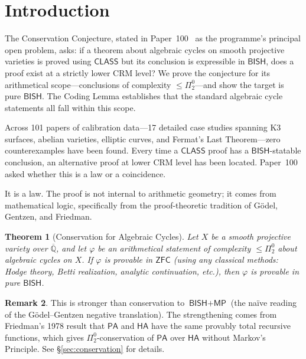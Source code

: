 \documentclass[11pt,a4paper]{article}
\theoremstyle{plain}
\newtheorem{theorem}{Theorem}[section]
\theoremstyle{definition}
\newtheorem{remark}[theorem]{Remark}
\newcommand{\BISH}{\textsf{BISH}}
\newcommand{\MP}{\textsf{MP}}
\newcommand{\CLASS}{\textsf{CLASS}}
\newcommand{\HA}{\textsf{HA}}
\newcommand{\PA}{\textsf{PA}}
\newcommand{\ZFC}{\textsf{ZFC}}
\newcommand{\Q}{\mathbb{Q}}
\begin{document}
\tableofcontents
\newpage

\section{Introduction}\label{sec:intro}

The Conservation Conjecture, stated in Paper~100~\cite{p100} as the programme's principal open problem, asks: if a theorem about algebraic cycles on smooth projective varieties is proved using $\CLASS$ but its conclusion is expressible in $\BISH$, does a proof exist at a strictly lower CRM level?  We prove the conjecture for its arithmetical scope---conclusions of complexity $\le \Pi^0_2$---and show the target is pure $\BISH$.  The Coding Lemma establishes that the standard algebraic cycle statements all fall within this scope.

Across 101 papers of calibration data---17 detailed case studies spanning K3 surfaces, abelian varieties, elliptic curves, and Fermat's Last Theorem---zero counterexamples have been found.  Every time a $\CLASS$ proof has a $\BISH$-statable conclusion, an alternative proof at lower CRM level has been located.  Paper~100 asked whether this is a law or a coincidence.

It is a law.  The proof is not internal to arithmetic geometry; it comes from mathematical logic, specifically from the proof-theoretic tradition of G\"odel, Gentzen, and Friedman.

\begin{theorem}[Conservation for Algebraic Cycles]\label{thm:A}
Let $X$ be a smooth projective variety over $\overline{\Q}$, and let $\varphi$ be an arithmetical statement of complexity $\le \Pi^0_2$ about algebraic cycles on $X$.  If $\varphi$ is provable in $\ZFC$ (using any classical methods: Hodge theory, Betti realization, analytic continuation, etc.), then $\varphi$ is provable in pure $\BISH$.
\end{theorem}

\begin{remark}
This is stronger than conservation to $\BISH + \MP$ (the na\"ive reading of the G\"odel--Gentzen negative translation).  The strengthening comes from Friedman's 1978 result that $\PA$ and $\HA$ have the same provably total recursive functions, which gives $\Pi^0_2$-conservation of $\PA$ over $\HA$ without Markov's Principle.  See \S\ref{sec:conservation} for details.
\end{remark}
\end{document}
